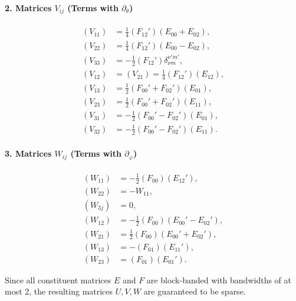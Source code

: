 \documentclass[preprint,12pt]{elsarticle}
\begin{document}
\paragraph{2. Matrices $V_{ij}$ (Terms with $\partial_\theta$)}
\begin{align*}
    (V_{11}) &= \frac{1}{4}(F_{12}')(E_{00}+E_{02}), \\
    (V_{22}) &= \frac{1}{4}(F_{12}')(E_{00}-E_{02}), \\
    (V_{33}) &= -\frac{1}{2}(F_{12}')\delta_{\nu m}^{\nu' m'}, \\
    (V_{12}) &= (V_{21}) = \frac{1}{4}(F_{12}')(E_{12}), \\
    (V_{13}) &= \frac{1}{2}(F_{00}'+F_{02}')(E_{01}), \\
    (V_{23}) &= \frac{1}{2}(F_{00}'+F_{02}')(E_{11}), \\
    (V_{31}) &= -\frac{1}{2}(F_{00}'-F_{02}')(E_{01}), \\
    (V_{32}) &= -\frac{1}{2}(F_{00}'-F_{02}')(E_{11}).
\end{align*}

\paragraph{3. Matrices $W_{ij}$ (Terms with $\partial_\varphi$)}
\begin{align*}
    (W_{11}) &= -\frac{1}{2}(F_{00})(E_{12}'), \\
    (W_{22}) &= -W_{11}, \\
    (W_{3j}) &= 0, \\
    (W_{12}) &= -\frac{1}{2}(F_{00})(E_{00}' - E_{02}'), \\
    (W_{21}) &= \frac{1}{2}(F_{00})(E_{00}' + E_{02}'), \\
    (W_{13}) &= -(F_{01})(E_{11}'), \\
    (W_{23}) &= (F_{01})(E_{01}').
\end{align*}

Since all constituent matrices $E$ and $F$ are block-banded with bandwidths of at most 2, the resulting matrices $U, V, W$ are guaranteed to be sparse.



\end{document}
